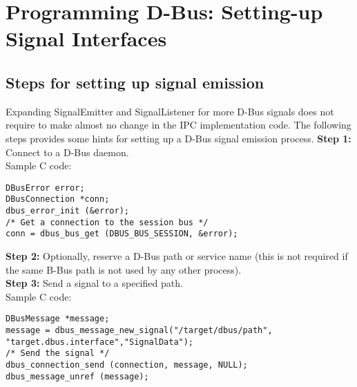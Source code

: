 \chapter{Programming D-Bus: Setting-up Signal Interfaces}
\section{Steps for setting up signal emission}
Expanding SignalEmitter and SignalListener for more D-Bus signals does not require to make almost no change in the IPC implementation code. The following steps provides some hints for 
setting up a D-Bus signal emission process.
\textbf{Step 1:} Connect to a D-Bus daemon. \\
Sample C code:
\lstset{language=C,basicstyle=\small}
\begin{lstlisting}
DBusError error;
DBusConnection *conn;
dbus_error_init (&error);
/* Get a connection to the session bus */
conn = dbus_bus_get (DBUS_BUS_SESSION, &error);
\end{lstlisting}
\textbf{Step 2:} Optionally, reserve a D-Bus path or service name (this is not required if the same B-Bus path is not used by any other process).\\
\textbf{Step 3:} Send a signal to a specified path.\\
Sample C code:
\begin{lstlisting} 
DBusMessage *message;
message = dbus_message_new_signal("/target/dbus/path",
"target.dbus.interface","SignalData");
/* Send the signal */
dbus_connection_send (connection, message, NULL);
dbus_message_unref (message);
\end{lstlisting}
